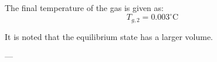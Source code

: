 The final temperature of the gas is given as:  
\[
T_{g,2} = 0.003^\circ\text{C}
\]  

It is noted that the equilibrium state has a larger volume.  

---